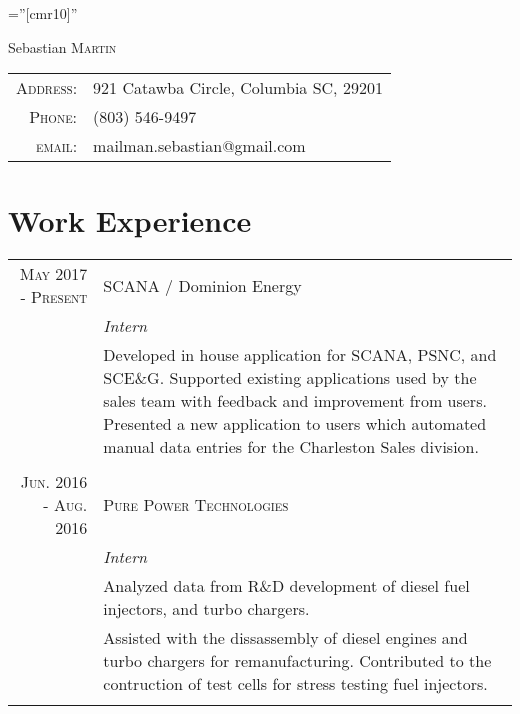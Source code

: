 \documentclass[a4paper,10pt]{article}
\begin{document}

\pagestyle{empty} %

\font\fb=''[cmr10]'' %

\par{\centering
		{\Huge Sebastian \textsc{Martin}
	}\bigskip\par}

\begin{center}
	\begin{tabular}{r|l}
    \textsc{Address:}   & 921 Catawba Circle, Columbia SC, 29201\\
    \textsc{Phone:}     & (803) 546-9497\\
    \textsc{email:}     & {mailman.sebastian@gmail.com}
\end{tabular}
\end{center}


\section{Work Experience}
\begin{tabular}{r|p{11cm}}
 \textsc{May 2017 - Present} & SCANA / Dominion Energy
 \\&\emph{Intern}\\&\footnotesize{Developed in house application for SCANA, PSNC, and SCE\&G. Supported existing applications used by the sales team with feedback and improvement from users. Presented a new application to users which automated manual data entries for the Charleston Sales division. }\\\multicolumn{2}{c}{} \\
 

 \textsc{Jun. 2016 - Aug. 2016} & \textsc{Pure Power Technologies} \\&\emph{Intern}\\&\footnotesize{Analyzed data from R\&D development of diesel fuel injectors, and turbo chargers.} \\ & \footnotesize{Assisted with the dissassembly of diesel engines and turbo chargers for remanufacturing. Contributed to the contruction of test cells for stress testing fuel injectors.}\\\multicolumn{2}{c}{} 
\end{tabular}
\end{document}
